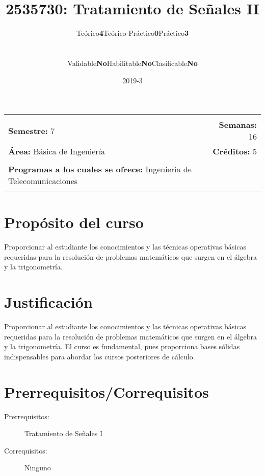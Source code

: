 \documentclass[11pt]{article}
\title{2535730: Tratamiento de Señales II}
\author{\begin{tabular} {c|c|c|c|c|c} Teórico & \textbf{4} & Teórico-Práctico & \textbf{0} & Práctico & \textbf{3}\end{tabular}
\\
\begin{tabular} {c|c|c|c|c|c} Validable & \textbf{No} & Habilitable & \textbf{No} & Clasificable & \textbf{No}\end{tabular}}
\date{2019-3}
\newcommand{\blankline}{\quad\pagebreak[2]}
\begin{document}
\maketitle

\begin{tabular*}{.93\textwidth}{@{\extracolsep{\fill}}lr}
\hline\\

\textbf{Semestre:} 7 & \textbf{Semanas:} 16
\\
\textbf{Área:} Básica de Ingeniería &    \textbf{Créditos:} 5 
\\ & \\
\textbf{Programas a los cuales se ofrece:} Ingeniería de Telecomunicaciones
\\ & \\
\hline
\end{tabular*}

\vspace{5 mm}

\section*{Propósito del curso}

Proporcionar al estudiante los conocimientos y las técnicas operativas básicas requeridas para la resolución de problemas matemáticos que surgen en el álgebra y la trigonometría.



\section*{Justificación}

Proporcionar al estudiante los conocimientos y las técnicas operativas básicas requeridas para la resolución de problemas matemáticos que surgen en el álgebra y la trigonometría. El curso es fundamental, pues proporciona bases sólidas indispensables para abordar los cursos posteriores de cálculo.

\section*{Prerrequisitos/Correquisitos}
\begin{description}
\item [Prerrequisitos:] Tratamiento de Señales I
\item[Correquisitos:] Ninguno
\end{description}
\end{document}
